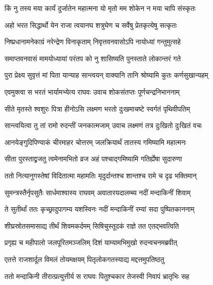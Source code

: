 \twolineshloka
{किं नु तस्य मया कार्यं दुर्जातेन महात्मना}
{यो मृतो मम शोकेन न मया चापि संस्कृतः} %

\twolineshloka
{अहो भरत सिद्धार्थो येन राजा त्वयानघ}
{शत्रुघेण च सर्वेषु प्रेतकृत्येषु सत्कृतः} %

\twolineshloka
{निष्प्रधानामनेकाग्रं नरेन्द्रेण विनाकृताम्}
{निवृत्तवनवासोऽपि नायोध्यां गन्तुमुत्सहे} %

\twolineshloka
{समाप्तवनवासं मामयोध्यायां परंतप}
{को नु शासिष्यति पुनस्ताते लोकान्तरं गते} %

\twolineshloka
{पुरा प्रेक्ष्य सुवृत्तं मां पिता यान्याह सान्त्वयन्}
{वाक्यानि तानि श्रोष्यामि कुतः कर्णसुखान्यहम्} %

\twolineshloka
{एवमुक्त्वा स भरतं भार्यामभ्येत्य राघवः}
{उवाच शोकसंतप्तः पूर्णचन्द्रनिभाननाम्} %

\twolineshloka
{सीते मृतस्ते श्वशुरः पित्रा हीनोऽसि लक्ष्मण}
{भरतो दुःखमाचष्टे स्वर्गतं पृथिवीपतिम्} %

\twolineshloka
{सान्त्वयित्वा तु तां रामो रुदन्तीं जनकात्मजाम्}
{उवाच लक्ष्मणं तत्र दुःखितो दुःखितं वचः} %

\twolineshloka
{आनयेङ्गुदिपिण्याकं चीरमाहर चोत्तरम्}
{जलक्रियार्थं तातस्य गमिष्यामि महात्मनः} %

\twolineshloka
{सीता पुरस्ताद्व्रजतु त्वमेनामभितो व्रज}
{अहं पश्चाद्गमिष्यामि गतिर्ह्येषा सुदारुणा} %

\twolineshloka
{ततो नित्यानुगस्तेषां विदितात्मा महामतिः}
{मृदुर्दान्तश्च शान्तश्च रामे च दृढ भक्तिमान्} %

\twolineshloka
{सुमन्त्रस्तैर्नृपसुतैः सार्धमाश्वास्य राघवम्}
{अवातारयदालम्ब्य नदीं मन्दाकिनीं शिवाम्} %

\twolineshloka
{ते सुतीर्थां ततः कृच्छ्रादुपागम्य यशस्विनः}
{नदीं मन्दाकिनीं रम्यां सदा पुष्पितकाननाम्} %

\twolineshloka
{शीघ्रस्रोतसमासाद्य तीर्थं शिवमकर्दमम्}
{सिषिचुस्तूदकं राज्ञे तत एतद्भवत्विति} %

\twolineshloka
{प्रगृह्य च महीपालो जलपूरितमञ्जलिम्}
{दिशं याम्यामभिमुखो रुदन्वचनमब्रवीत्} %

\twolineshloka
{एतत्ते राजशार्दूल विमलं तोयमक्षयम्}
{पितृलोकगतस्याद्य मद्दत्तमुपतिष्ठतु} %

\twolineshloka
{ततो मन्दाकिनी तीरात्प्रत्युत्तीर्य स राघवः}
{पितुश्चकार तेजस्वी निवापं भ्रातृभिः सह} %

